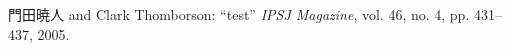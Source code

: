 %
%
\begin{thebibliography}{99}

門田暁人 and Clark Thomborson:
``test''
{\it IPSJ Magazine}, vol. 46, no. 4, pp. 431--437, 2005.


\end{thebibliography}
